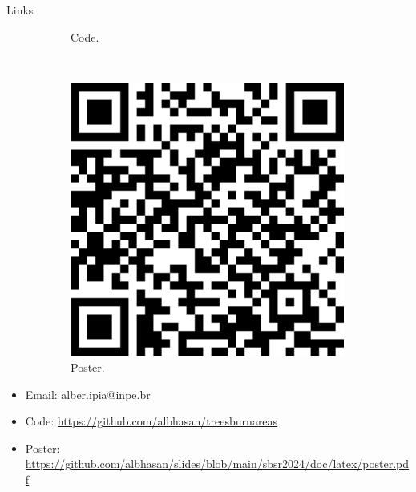 \documentclass[20pt]{beamer}
\begin{document}
\begin{frame}[fragile,t]
\begin{columns}[t]
\begin{column}{0.33\linewidth}
\begin{block}{Links}
\begin{figure}
\begin{subfigure}[b]{0.2\textwidth}
\centering
{Code.}
    \end{subfigure}
    ~
    \begin{subfigure}[b]{0.2\textwidth}
\includegraphics[width=0.99\textwidth]{images/qr_poster.png} \\
\centering
{Poster.}
    \end{subfigure}
\end{figure}
\vspace{1.0cm}
    \begin{itemize}
        \item Email: alber.ipia@inpe.br
        \item Code: {\small\url{https://github.com/albhasan/treesburnareas}}
        \item Poster: {\small\url{https://github.com/albhasan/slides/blob/main/sbsr2024/doc/latex/poster.pdf}}
    \end{itemize}
\vspace{0.5cm}
    \end{block}
\end{column}


\end{columns}
\end{frame}
\end{document}
